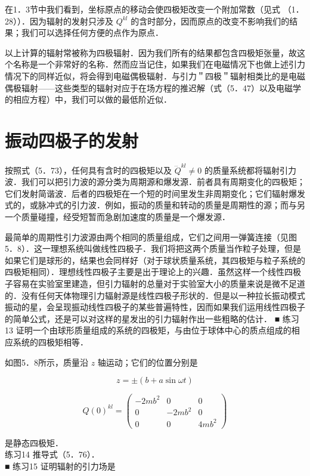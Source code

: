在1．3节中我们看到，坐标原点的移动会使四极矩改变一个附加常数（见式 （1．28））．因为辐射的发射只涉及 $Q^{k l}$ 的含时部分，因而原点的改变不影响我们的结果；我们可以选择任何方便的点作为原点．

以上计算的辐射常被称为四极辐射．因为我们所有的结果都包含四极矩张量，故这个名称是一个非常好的名称．然而应当记住，如果我们在电磁情况下也做上述引力情况下的同样近似，将会得到电磁偶极辐射．与引力＂四极＂辐射相类比的是电磁偶极辐射——这些类型的辐射对应于在场方程的推迟解（式（5．47）以及电磁学的相应方程）中，我们可以做的最低阶近似．

\section{振动四极子的发射}
按照式（5．73），任何具有含时的四极矩以及 $\dddot{Q}^{k l} \neq 0$ 的质量系统都将辐射引力波．我们可以把引力波的源分类为周期源和爆发源．前者具有周期变化的四极矩；它们发射简谐波．后者的四极矩在一个短的时间里发生非周期变化；它们辐射爆发式的，或脉冲式的引力波．例如，振动的质量和转动的质量是周期性的源；而与另一个质量碰撞，经受短暂而急剧加速度的质量是一个爆发源．

最简单的周期性引力波源由两个相同的质量组成，它们之间用一弹簧连接（见图5．8）．这一理想系统叫做线性四极子．我们将把这两个质量当作粒子处理，但是如果它们是球形的，结果也会同样好（对于球状质量系统，其四极矩与粒子系统的四极矩相同）．理想线性四极子主要是出于理论上的兴趣．虽然这样一个线性四极子容易在实验室里建造，但引力辐射的总量对于实验室大小的质量来说是微不足道的．没有任何天体物理引力辐射源是线性四极子形状的．但是以一种拉长振动模式振动的星，会呈现振动线性四极子的某些普遍特性，因而如果我们运用线性四极子的简单公式，还是可以对这样的星发出的引力辐射作出一些粗略的估计． ■ 练习13 证明一个由球形质量组成的系统的四极矩，与由位于球体中心的质点组成的相应系统的四极矩相等．

如图5．8所示，质量沿 $z$ 轴运动；它们的位置分别是


\begin{equation*}
	z= \pm(b+a \sin \omega t) \tag{5.74}
\end{equation*}



\[
Q(0)^{k l}=\left(\begin{array}{ccc}
	-2 m b^{2} & 0 & 0  \tag{5.77}\\
	0 & -2 m b^{2} & 0 \\
	0 & 0 & 4 m b^{2}
\end{array}\right)
\]

是静态四极矩．\\
练习14 推导式（5．76）．\\
■ 练习15 证明辐射的引力场是


